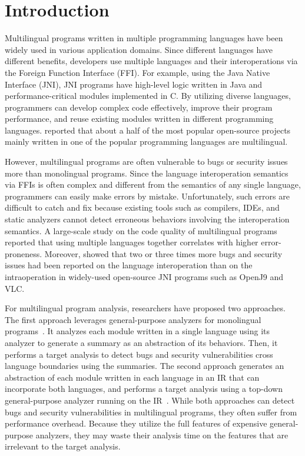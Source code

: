 \section{Introduction}
Multilingual programs written in multiple programming languages
have been widely used in various application domains.
Since different languages have different benefits,
developers use multiple languages and their interoperations
via the Foreign Function Interface (FFI). For example, using the Java Native Interface (JNI),
JNI programs have high-level logic written in Java and performance-critical
modules implemented in C. By utilizing diverse languages, programmers can
develop complex code effectively, improve their program performance,
and reuse existing modules written in different programming languages.
\citet{kochhar2016large} reported that about a half of the most popular open-source
projects mainly written in one of the popular programming languages are
multilingual.

However, multilingual programs are often vulnerable to bugs or security issues
more than monolingual programs. Since the language interoperation semantics
via FFIs is often complex and different from the semantics of any
single language, programmers can easily make errors by mistake.
Unfortunately, such errors are difficult to catch and fix because existing
tools such as compilers, IDEs, and static analyzers cannot detect erroneous
behaviors involving the interoperation semantics.
A large-scale study on the code quality of multilingual programs~\cite{kochhar2016large}
reported that using multiple languages together correlates with higher error-proneness.  
Moreover, \citet{grichi2020impact} showed that two or three times more
bugs and security issues had been reported on the language
interoperation than on the intraoperation in widely-used open-source JNI
programs such as OpenJ9 and VLC.

For multilingual program analysis, researchers have proposed two approaches.
The first approach leverages general-purpose analyzers for monolingual
programs~\cite{JN-SAF, LeeASE20}.  It analyzes each module
written in a single language using its analyzer to generate
a summary as an abstraction of its behaviors.  Then, it performs a target
analysis to detect bugs and security vulnerabilities cross language boundaries
using the summaries. The second approach generates an abstraction
of each module written in each language in an IR that can
incorporate both languages, and performs
a target analysis using a top-down general-purpose analyzer
running on the IR~\cite{hybridroid, cpython}.
While both approaches can detect bugs and security vulnerabilities
in multilingual programs, they often suffer from performance overhead.
Because they utilize the full features of expensive general-purpose analyzers,
they may waste their analysis time on the features that are irrelevant to
the target analysis.

